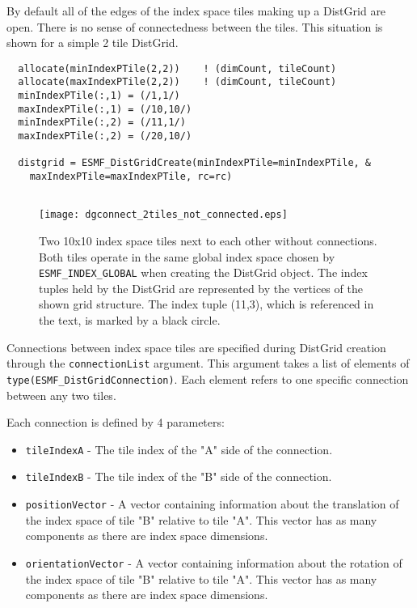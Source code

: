    By default all of the edges of the index space tiles making up a DistGrid
   are open. There is no sense of connectedness between the tiles. This situation
   is shown for a simple 2 tile DistGrid. 

 \begin{verbatim}
  allocate(minIndexPTile(2,2))    ! (dimCount, tileCount)
  allocate(maxIndexPTile(2,2))    ! (dimCount, tileCount)
  minIndexPTile(:,1) = (/1,1/)
  maxIndexPTile(:,1) = (/10,10/)
  minIndexPTile(:,2) = (/11,1/)
  maxIndexPTile(:,2) = (/20,10/)
  
  distgrid = ESMF_DistGridCreate(minIndexPTile=minIndexPTile, &
    maxIndexPTile=maxIndexPTile, rc=rc)
 
\end{verbatim}
 

   \begin{figure}[h]
     \caption{Two 10x10 index space tiles next to each other without
       connections. Both tiles operate in the same global index space chosen 
       by {\tt ESMF\_INDEX\_GLOBAL} when creating the DistGrid object.
       The index tuples held by the DistGrid are represented by the vertices of
       the shown grid structure. The index tuple (11,3), which is referenced in
       the text, is marked by a black circle.}
     \centering
     \texttt{[image: dgconnect\_2tiles\_not\_connected.eps]}
     \label{fig:dgconnect_2tiles_not_connected}
   \end{figure}
  
   Connections between index space tiles are specified during DistGrid
   creation through the {\tt connectionList} argument. This argument takes
   a list of elements of {\tt type(ESMF\_DistGridConnection)}. Each element
   refers to one specific connection between any two tiles.
  
   Each connection is defined by 4 parameters:
   \begin{itemize}
   \item {\tt tileIndexA} - The tile index of the "A" side of the connection.
   \item {\tt tileIndexB} - The tile index of the "B" side of the connection.
   \item {\tt positionVector} - A vector containing information about the
                                translation of the index space of tile "B" 
                                relative to tile "A". This vector has as many
                                components as there are index space dimensions.
   \item {\tt orientationVector} - A vector containing information about
                                   the rotation of the index space of tile "B"
                                   relative to tile "A". This vector has as many
                                   components as there are index space dimensions.
   \end{itemize}
  
